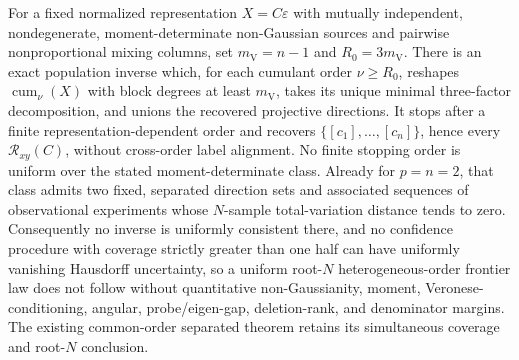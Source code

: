 For a fixed normalized representation \(X=C\varepsilon\) with mutually independent, nondegenerate, moment-determinate non-Gaussian sources and pairwise nonproportional mixing columns, set \(m_{\mathrm V}=n-1\) and \(R_0=3m_{\mathrm V}\). There is an exact population inverse which, for each cumulant order \(\nu\ge R_0\), reshapes \(\operatorname{cum}_\nu(X)\) with block degrees at least \(m_{\mathrm V}\), takes its unique minimal three-factor decomposition, and unions the recovered projective directions. It stops after a finite representation-dependent order and recovers \(\{[c_1],\ldots,[c_n]\}\), hence every \(\mathcal R_{xy}(C)\), without cross-order label alignment. No finite stopping order is uniform over the stated moment-determinate class. Already for \(p=n=2\), that class admits two fixed, separated direction sets and associated sequences of observational experiments whose \(N\)-sample total-variation distance tends to zero. Consequently no inverse is uniformly consistent there, and no confidence procedure with coverage strictly greater than one half can have uniformly vanishing Hausdorff uncertainty, so a uniform root-\(N\) heterogeneous-order frontier law does not follow without quantitative non-Gaussianity, moment, Veronese-conditioning, angular, probe/eigen-gap, deletion-rank, and denominator margins. The existing common-order separated theorem retains its simultaneous coverage and root-\(N\) conclusion.
